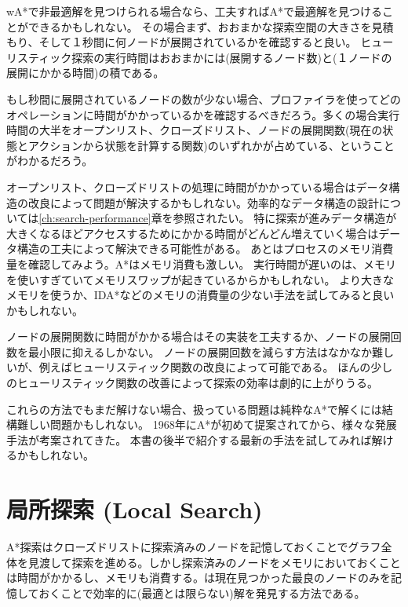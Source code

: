 wA*で非最適解を見つけられる場合なら、工夫すればA*で最適解を見つけることができるかもしれない。
その場合まず、おおまかな探索空間の大きさを見積もり、そして１秒間に何ノードが展開されているかを確認すると良い。
ヒューリスティック探索の実行時間はおおまかには(展開するノード数)と(１ノードの展開にかかる時間)の積である。

もし秒間に展開されているノードの数が少ない場合、プロファイラを使ってどのオペレーションに時間がかかっているかを確認するべきだろう。多くの場合実行時間の大半をオープンリスト、クローズドリスト、ノードの展開関数(現在の状態とアクションから状態を計算する関数)のいずれかが占めている、ということがわかるだろう。

オープンリスト、クローズドリストの処理に時間がかかっている場合はデータ構造の改良によって問題が解決するかもしれない。効率的なデータ構造の設計については\ref{ch:search-performance}章を参照されたい。
特に探索が進みデータ構造が大きくなるほどアクセスするためにかかる時間がどんどん増えていく場合はデータ構造の工夫によって解決できる可能性がある。
あとはプロセスのメモリ消費量を確認してみよう。A*はメモリ消費も激しい。
実行時間が遅いのは、メモリを使いすぎていてメモリスワップが起きているからかもしれない。
より大きなメモリを使うか、IDA*などのメモリの消費量の少ない手法を試してみると良いかもしれない。

ノードの展開関数に時間がかかる場合はその実装を工夫するか、ノードの展開回数を最小限に抑えるしかない。
ノードの展開回数を減らす方法はなかなか難しいが、例えばヒューリスティック関数の改良によって可能である。
ほんの少しのヒューリスティック関数の改善によって探索の効率は劇的に上がりうる。

これらの方法でもまだ解けない場合、扱っている問題は純粋なA*で解くには結構難しい問題かもしれない。
1968年にA*が初めて提案されてから、様々な発展手法が考案されてきた。
本書の後半で紹介する最新の手法を試してみれば解けるかもしれない。


\section{局所探索 (Local Search)}
\label{sec:local-search}

A*探索はクローズドリストに探索済みのノードを記憶しておくことでグラフ全体を見渡して探索を進める。しかし探索済みのノードをメモリにおいておくことは時間がかかるし、メモリも消費する。は現在見つかった最良のノードのみを記憶しておくことで効率的に(最適とは限らない)解を発見する方法である。

